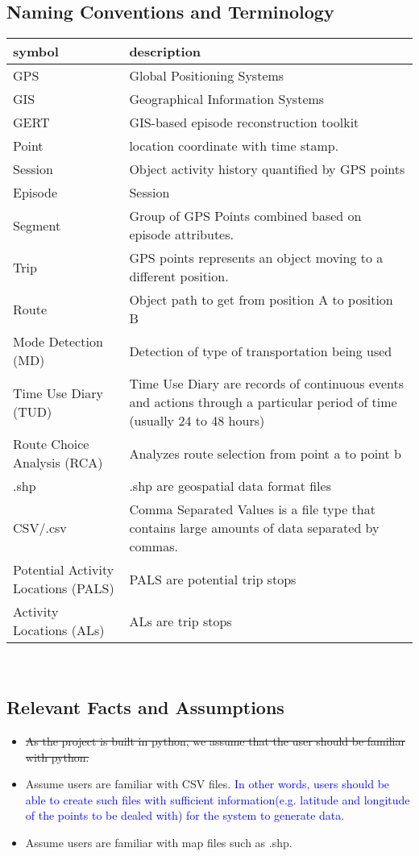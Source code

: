 \documentclass[12pt, titlepage]{article}
\begin{document}
\subsection{Naming Conventions and Terminology}
\begin{tabular}{l p{6cm}} 
  \toprule		
  \textbf{symbol} & \textbf{description}\\
  \midrule 
  GPS & Global Positioning Systems\\
  GIS & Geographical Information Systems\\
  GERT & GIS-based episode reconstruction toolkit \\
  Point & location coordinate with time stamp.\\
  Session & Object activity history quantified by GPS points \\
  Episode & Session\\
  Segment & Group of GPS Points combined based on episode attributes.\\
  Trip & GPS points represents an object moving to a different position.\\
  Route & Object path to get from position A to position B\\
  Mode Detection (MD) & Detection of type of transportation being used \\
  Time Use Diary (TUD) & Time Use Diary are records of continuous events and actions through a particular period of time (usually 24 to 48 hours) \\
  Route Choice Analysis (RCA) &  Analyzes route selection from point a to point b\\
  .shp & .shp are geospatial data format files\\
  CSV/.csv & Comma Separated Values is a file type that contains large amounts of data separated by commas. \\
  Potential Activity Locations (PALS) & PALS are potential trip stops \\
  Activity Locations (ALs) & ALs are trip stops \\


  \bottomrule
\end{tabular}\\

\subsection{Relevant Facts and Assumptions}
\begin{itemize}
    \item \sout{As the project is built in python, we assume that the user should be familiar with python.}
    \item Assume users are familiar with CSV files. \textcolor{blue}{ In other words, users should be able to create such files with sufficient information(e.g. latitude and longitude of the points to be dealed with) for the system to generate data.}
    \item Assume users are familiar with map files such as .shp.
\end{itemize}
\end{document}
